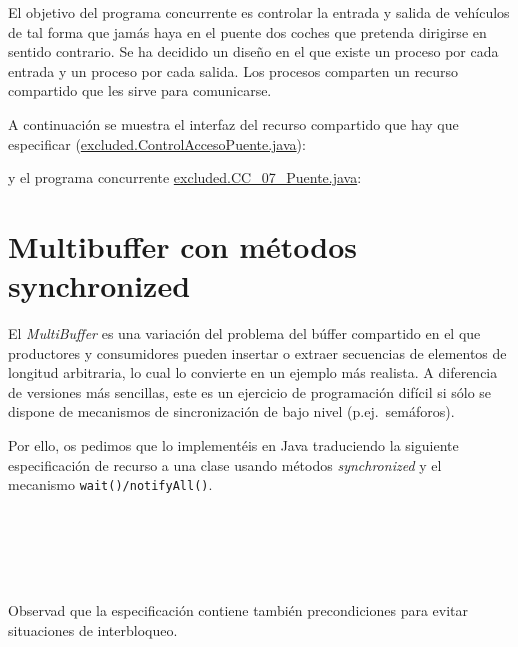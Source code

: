 \documentclass{article}
\begin{document}
El objetivo del programa concurrente es controlar la entrada y salida
de vehículos de tal forma que jamás haya en el puente dos coches que
pretenda dirigirse en sentido contrario.  Se ha decidido un diseño en
el que existe un proceso por cada entrada y un proceso por cada
salida. Los procesos comparten un recurso compartido que les sirve
para comunicarse.

A continuación se muestra el interfaz del recurso
compartido que hay que especificar \linebreak (\url{excluded.ControlAccesoPuente.java}):

y el programa concurrente \url{excluded.CC_07_Puente.java}:


\clearpage
\section{Multibuffer con métodos synchronized}
El \emph{MultiBuffer} es una variación del problema del búffer
compartido en el que productores y consumidores pueden insertar o
extraer secuencias de elementos de longitud arbitraria, lo cual lo
convierte en un ejemplo más realista. A diferencia de versiones más
sencillas, este es un ejercicio de programación difícil si sólo se
dispone de mecanismos de sincronización de bajo nivel
(p.ej.~semáforos). 

Por ello, os pedimos que lo implementéis en Java traduciendo la
siguiente especificación de recurso a una clase usando métodos
\emph{synchronized} y el mecanismo \texttt{wait()/notifyAll()}. 

\begin{ctadsol}
  \\
  \operaciones
  \\
  \semdom
  \inicial{\self}{$\self = \secv$}
  \\
  \\
\end{ctadsol}
%
Observad que la especificación contiene también precondiciones para
evitar situaciones de interbloqueo. 
\end{document}
